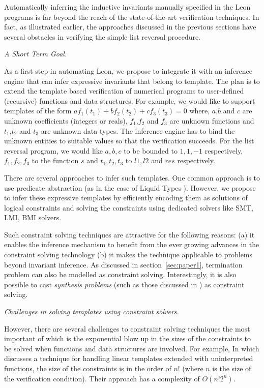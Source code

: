 Automatically inferring the inductive invariants manually specified in the Leon programs is far beyond the reach of the state-of-the-art verification techniques. 
In fact, as illustrated earlier, the approaches discussed in the previous sections have several obstacles in verifying the simple list reversal procedure.

\emph{A Short Term Goal.}

As a first step in automating Leon, we propose to integrate it with an inference engine that can infer expressive invariants that belong to template.
The plan is to extend the template based verification of numerical programs to user-defined (recursive) functions and data structures. For example, we would like to support templates of the form 
$af_1(t_1) + bf_2(t_2) + cf_3(t_3) = 0$ where, $a$,$b$ and $c$ are unknown coefficients (integers or reals), $f_1$,$f_2$ and $f_3$ are unknown functions and $t_1$,$t_2$ and $t_3$ are unknown data types.
The inference engine has to bind the unknown entities to suitable values so that the verification succeeds. 
For the list reversal program, we would like $a,b,c$  to be bounded to $1,1,-1$ respectively, $f_1,f_2,f_3$ to the function $s$ and $t_1,t_2,t_3$
to $l1,l2$ and $res$ respectively.

There are several approaches to infer such templates. One common approach
is to use predicate abstraction (as in the case of Liquid Types \cite{rjhala:PLDI08}).
However, we propose to infer these expressive templates by efficiently encoding them as solutions of logical constraints and solving the constraints using dedicated solvers like SMT, LMI, BMI solvers.

Such constraint solving techniques are attractive for the following reasons:
(a) it enables the inference mechanism to benefit from the ever growing advances in the constraint solving technology
(b) it makes the technique applicable to problems beyond invariant inference. 
As discussed in section~\ref{sec:paper1}, termination problem can also be 
modelled as constraint solving. 
Interestingly, it is also possible to cast \emph{synthesis problems} 
(such as those discussed in \cite{vkuncak:PLDI10}) as constraint solving.

\emph{Challenges in solving templates using constraint solvers.}

However, there are several challenges to constraint solving techniques the most important of which is the exponential blow up in the sizes of the constraints to be solved when functions and data structures are involved.
For example, In \cite{dirk:VMCAI07} which discusses a technique 
for handling linear templates extended with uninterpreted functions, 
the size of the constraints is in the order of $n!$ 
(where $n$ is the size of the verification condition). 
Their approach has a complexity of $O(n!2^n)$.

